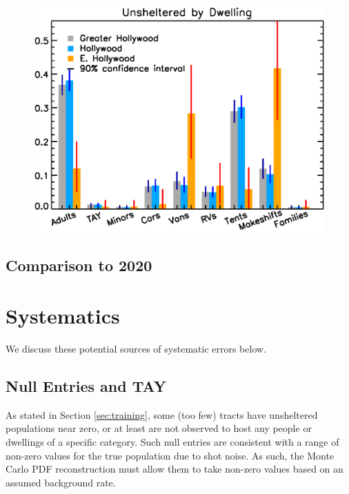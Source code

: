 \documentclass[11pt,twocolumn]{article}
\begin{document}
\begin{figure}[h]
	\centering
	\includegraphics[width =\linewidth]{allTracts/allBreakdownBar}
	\caption{}
\end{figure}

\subsection{Comparison to 2020}
\label{sec:comp}

\section{Systematics}
\label{sec:systematics}

We discuss these potential sources of systematic errors below.

\subsection{Null Entries and TAY}
\label{sec:nulls}

As stated in Section \ref{sec:training}, some (too few) tracts have unsheltered populations near zero, 
or at least are not observed to host any people or dwellings of a specific category. Such null entries 
are consistent with a range of non-zero values for the true population due to shot noise. As such, the 
Monte Carlo PDF reconstruction must allow them to take non-zero values based on an assumed background
rate. 
\end{document}
